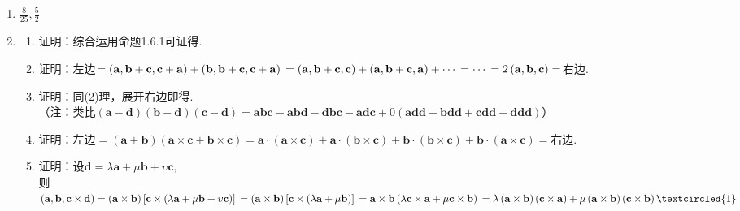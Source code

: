 \documentclass[UTF8]{ctexart}
\begin{document}
\begin{enumerate}
\item $\displaystyle\frac{8}{25},\displaystyle\frac{5}{2}$

\item \begin{enumerate}[(1)]
\item 证明：综合运用命题1.6.1可证得.
\item 证明：左边$=\left(\mathbf{a},\mathbf{b}+\mathbf{c},\mathbf{c}+\mathbf{a}\right)+\left(\mathbf{b},\mathbf{b}+\mathbf{c},\mathbf{c}+\mathbf{a}\right)\\
=\left(\mathbf{a},\mathbf{b}+\mathbf{c},\mathbf{c}\right)+\left(\mathbf{a},\mathbf{b}+\mathbf{c},\mathbf{a}\right)+\cdots\\
=\cdots\\
=2\left(\mathbf{a},\mathbf{b},\mathbf{c}\right)=$右边. 
\item 证明：同(2)理，展开右边即得.\\
（注：类比$\left(\mathbf{a}-\mathbf{d}\right)\left(\mathbf{b}-\mathbf{d}\right)\left(\mathbf{c}-\mathbf{d}\right)=\mathbf{a}\mathbf{b}\mathbf{c}-\mathbf{a}\mathbf{b}\mathbf{d}-\mathbf{d}\mathbf{b}\mathbf{c}-\mathbf{a}\mathbf{d}\mathbf{c}+0\left(\mathbf{a}\mathbf{d}\mathbf{d}+\mathbf{b}\mathbf{d}\mathbf{d}+\mathbf{c}\mathbf{d}\mathbf{d}-\mathbf{d}\mathbf{d}\mathbf{d}\right)$）
\item 证明：左边$=\left(\mathbf{a}+\mathbf{b}\right)\left(\mathbf{a}\times\mathbf{c}+\mathbf{b}\times\mathbf{c}\right)=\mathbf{a}\cdot\left(\mathbf{a}\times\mathbf{c}\right)+\mathbf{a}\cdot\left(\mathbf{b}\times\mathbf{c}\right)+\mathbf{b}\cdot\left(\mathbf{b}\times\mathbf{c}\right)+\mathbf{b}\cdot\left(\mathbf{a}\times\mathbf{c}\right)=$右边.
\item 证明：设$\mathbf{d}=\lambda\mathbf{a}+\mu\mathbf{b}+\upsilon\mathbf{c},$\\则$\left(\mathbf{a},\mathbf{b},\mathbf{c}\times\mathbf{d}\right)=\left(\mathbf{a}\times\mathbf{b}\right)\left[\mathbf{c}\times\left(\lambda\mathbf{a}+\mu\mathbf{b}+\upsilon\mathbf{c}\right)\right]\\
=\left(\mathbf{a}\times\mathbf{b}\right)\left[\mathbf{c}\times\left(\lambda\mathbf{a}+\mu\mathbf{b}\right)\right]\\
=\mathbf{a}\times\mathbf{b}\left(\lambda\mathbf{c}\times\mathbf{a}+\mu\mathbf{c}\times\mathbf{b}\right)\\
=\lambda\left(\mathbf{a}\times\mathbf{b}\right)\left(\mathbf{c}\times\mathbf{a}\right)+\mu\left(\mathbf{a}\times\mathbf{b}\right)\left(\mathbf{c}\times\mathbf{b}\right)\textcircled{1}\\$

\end{enumerate}
\end{enumerate}
\end{document}
